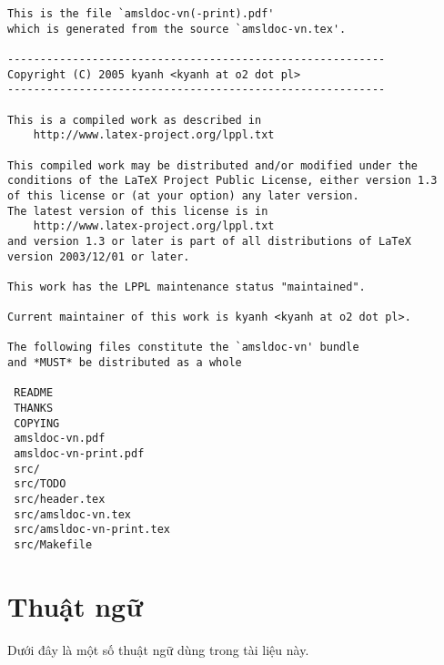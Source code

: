 \begin{verbatim}
This is the file `amsldoc-vn(-print).pdf'
which is generated from the source `amsldoc-vn.tex'.

----------------------------------------------------------
Copyright (C) 2005 kyanh <kyanh at o2 dot pl>
----------------------------------------------------------

This is a compiled work as described in
    http://www.latex-project.org/lppl.txt

This compiled work may be distributed and/or modified under the
conditions of the LaTeX Project Public License, either version 1.3
of this license or (at your option) any later version.
The latest version of this license is in
    http://www.latex-project.org/lppl.txt
and version 1.3 or later is part of all distributions of LaTeX
version 2003/12/01 or later.

This work has the LPPL maintenance status "maintained".

Current maintainer of this work is kyanh <kyanh at o2 dot pl>.

The following files constitute the `amsldoc-vn' bundle
and *MUST* be distributed as a whole

 README
 THANKS
 COPYING
 amsldoc-vn.pdf
 amsldoc-vn-print.pdf
 src/
 src/TODO
 src/header.tex
 src/amsldoc-vn.tex
 src/amsldoc-vn-print.tex
 src/Makefile
\end{verbatim}

\ifx\printversion\undefined
	\newpage
\else
	\cleardoublepage
\fi

\tableofcontents

\cleardoublepage %



\chapter{Thuật ngữ}

Dưới đây là một số thuật ngữ dùng trong tài liệu này.

